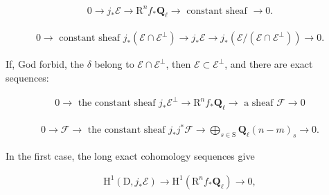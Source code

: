 \documentclass[10pt,leqno]{article}
\begin{document}
\begin{equation*}\begin{gathered}0 \longrightarrow  j_{*}\mathcal{E}  \longrightarrow  \mathrm{R}^{n} f_{*}\mathbf{Q}_{\ell } \longrightarrow \text{ constant sheaf }\longrightarrow  0.\end{gathered}\tag{7.1.2}\end{equation*}

\begin{equation*}\begin{gathered}0 \longrightarrow \text{ constant sheaf }j_{*}(\mathcal{E} \cap \mathcal{E} ^{\perp }) \longrightarrow  j_{*}\mathcal{E}  \longrightarrow  j_{*}(\mathcal{E} /(\mathcal{E} \cap \mathcal{E} ^{\perp })) \longrightarrow  0.\end{gathered}\tag{7.1.3}\end{equation*}

\noindent If, God forbid, the \(\delta \) belong to \(\mathcal{E} \cap \mathcal{E} ^{\perp }\), then \(\mathcal{E} \subset \mathcal{E} ^{\perp }\), and there are exact sequences:\par

\begin{equation*}\begin{gathered}0 \longrightarrow \text{ the constant sheaf }j_{*}\mathcal{E} ^{\perp } \longrightarrow  \mathrm{R}^{n} f_{*}\mathbf{Q}_{\ell } \longrightarrow \text{ a sheaf }\mathcal{F}  \longrightarrow  0\end{gathered}\tag{7.1.4}\end{equation*}

\begin{equation*}\begin{gathered}0 \longrightarrow  \mathcal{F}  \longrightarrow \text{ the constant sheaf }j_{*}j^{*}\mathcal{F}  \longrightarrow  \bigoplus\limits_{s\in \mathrm{S}}\mathbf{Q}_{\ell }(n- m)_{s} \longrightarrow  0.\end{gathered}\tag{7.1.5}\end{equation*}

\noindent In the first case, the long exact cohomology sequences give\par

\begin{equation*}\begin{gathered}\mathrm{H}^{1}(\mathrm{D},j_{*}\mathcal{E} ) \longrightarrow  \mathrm{H}^{1}(\mathrm{R}^{n} f_{*}\mathbf{Q}_{\ell }) \longrightarrow  0,\end{gathered}\tag{7.1.2′}\end{equation*}
\end{document}
